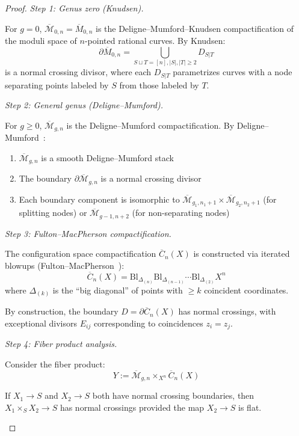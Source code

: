 \begin{proof}

\emph{Step 1: Genus zero (Knudsen).}

For $g=0$, $\overline{\mathcal{M}}_{0,n} = \overline{M}_{0,n}$ is the Deligne--Mumford--Knudsen 
compactification of the moduli space of $n$-pointed rational curves. By Knudsen:
\[\partial \overline{M}_{0,n} = \bigcup_{S \sqcup T = [n], |S|,|T| \geq 2} D_{S|T}\]
is a normal crossing divisor, where each $D_{S|T}$ parametrizes curves with a node 
separating points labeled by $S$ from those labeled by $T$.

\emph{Step 2: General genus (Deligne--Mumford).}

For $g \geq 0$, $\overline{\mathcal{M}}_{g,n}$ is the Deligne--Mumford compactification. 
By Deligne--Mumford~\cite{DeligneM69}:
\begin{enumerate}
\item $\overline{\mathcal{M}}_{g,n}$ is a smooth Deligne--Mumford stack
\item The boundary $\partial \overline{\mathcal{M}}_{g,n}$ is a normal crossing divisor
\item Each boundary component is isomorphic to $\overline{\mathcal{M}}_{g_1,n_1+1} \times 
\overline{\mathcal{M}}_{g_2,n_2+1}$ (for splitting nodes) or 
$\overline{\mathcal{M}}_{g-1,n+2}$ (for non-separating nodes)
\end{enumerate}

\emph{Step 3: Fulton--MacPherson compactification.}

The configuration space compactification $\overline{C}_n(X)$ is constructed via iterated 
blowups (Fulton--MacPherson~\cite{FM94}):
\[\overline{C}_n(X) = \text{Bl}_{\Delta_{(n)}} \text{Bl}_{\Delta_{(n-1)}} \cdots 
\text{Bl}_{\Delta_{(2)}} X^n\]
where $\Delta_{(k)}$ is the ``big diagonal'' of points with $\geq k$ coincident coordinates.

By construction, the boundary $D = \partial \overline{C}_n(X)$ has normal crossings, 
with exceptional divisors $E_{ij}$ corresponding to coincidences $z_i = z_j$.

\emph{Step 4: Fiber product analysis.}

Consider the fiber product:
\[Y := \overline{\mathcal{M}}_{g,n} \times_{X^n} \overline{C}_n(X)\]

\begin{lemma}\label{lem:fiber-product-NC}
If $X_1 \to S$ and $X_2 \to S$ both have normal crossing boundaries, then
$X_1 \times_S X_2 \to S$ has normal crossings provided the map $X_2 \to S$ is flat.
\end{lemma}


\end{proof}
